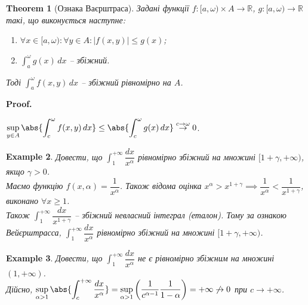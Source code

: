 \documentclass[a4paper, 10pt]{article}
\makeatletter
\def\huge{\displaystyle}
\def\qed{$\blacksquare$}
\theoremstyle{theoremdd}
\newtheorem{theorem}{Theorem}[subsection]
\theoremstyle{theoremdd}
\theoremstyle{theoremdd}
\theoremstyle{theoremdd}
\theoremstyle{theoremdd}
\newtheorem{example}[theorem]{Example}
\theoremstyle{theoremdd}
\theoremstyle{theoremdd}
\theoremstyle{theoremdd}
\theoremstyle{theoremdd}
\renewenvironment{proof}[1][Proof.\\]{\par
\pushQED{\hfill \qed}%
\normalfont \topsep6\p@\@plus6\p@\relax
\trivlist
\item\relax
{\bfseries
#1\@addpunct{.}}\hspace\labelsep\ignorespaces
}{%
\popQED\endtrivlist\@endpefalse
}
\makeatother
\begin{document}
\begin{theorem}[Ознака Ваєрштраса]
Задані функції $f \colon [a,\omega) \times A \to \mathbb{R}$, $g \colon [a,\omega) \to \mathbb{R}$ такі, що виконується наступне:
\begin{enumerate}[nosep,wide=0pt,label={\arabic*)}]
\item $\forall x \in [a,\omega): \forall y \in A: |f(x,y)| \leq g(x)$;
\item $\huge \int_a^\omega g(x)\,dx$ -- збіжний.
\end{enumerate}
Тоді $\huge \int_a^\omega f(x,y)\,dx$ -- збіжний рівномірно на $A$.
\end{theorem}

\begin{proof}
$\huge \sup_{y \in A} \abs{\int_c^\omega f(x,y)\,dx} \leq \abs{\int_c^\omega g(x)\,dx} \overset{c \to \omega}{\to} 0$.
\end{proof}

\begin{example}
Довести, що $\huge\int_1^{+\infty} \dfrac{dx}{x^\alpha}$ рівномірно збіжний на множині $[1+\gamma,+\infty)$, якщо $\gamma > 0$.\\
Маємо функцію $f(x,\alpha) = \dfrac{1}{x^\alpha}$. Також відома оцінка $x^\alpha > x^{1+\gamma} \implies \dfrac{1}{x^\alpha} < \dfrac{1}{x^{1+\gamma}}$, виконано $\forall x \geq 1$.\\
Також $\huge\int_1^{+\infty} \dfrac{dx}{x^{1+\gamma}}$ -- збіжний невласний інтеграл (еталон). Тому за ознакою Вейєрштрасса, $\huge\int_1^{+\infty} \dfrac{dx}{x^\alpha}$ рівномірно збіжний на множині $[1+\gamma,+\infty)$.
\end{example}

\begin{example}
Довести, що $\huge\int_1^{+\infty} \dfrac{dx}{x^\alpha}$ не є рівномірно збіжним на множині $(1,+\infty)$.\\
Дійсно, $\huge\sup_{\alpha > 1} \abs{\int_c^{+\infty} \dfrac{dx}{x^\alpha}} = \sup_{\alpha >1} \left(\dfrac{1}{c^{\alpha-1}} \dfrac{1}{1-\alpha}\right) = +\infty \not\to 0$ при $c \to +\infty$.
\end{example}
\end{document}
